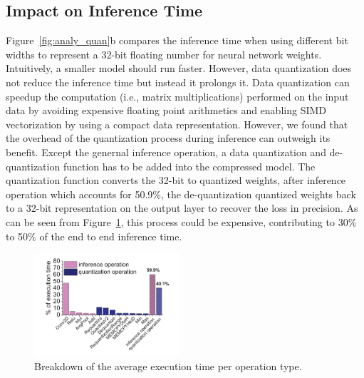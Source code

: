\subsection{Impact on Inference Time\label{sec:time}}
 Figure~\ref{fig:analy_quan}b compares the inference time when using different bit
widths to represent a 32-bit floating number for neural network weights. Intuitively, a smaller model should run faster. However, data
quantization does not reduce the inference time but instead it prolongs it. Data quantization can speedup the computation (i.e., matrix
multiplications) performed on the input data by avoiding expensive floating point arithmetics and enabling SIMD vectorization by using a
compact data representation. However, we found that the overhead of the quantization process during inference can outweigh its benefit.
Except the genernal inference operation, a data quantization and de-quantization function has to be added into the compressed model. The quantization function converts the 32-bit to quantized weights, after inference operation which
accounts for 50.9\%, the de-quantization quantized
weights back to a 32-bit representation on the output layer to recover the loss in precision. As can be seen from Figure~\ref{fig:breakdown}, this process could be expensive, contributing to 30\% to 50\% of the end to end inference time.

\begin{figure}
\begin{center}
\includegraphics[width=0.48\textwidth]{figure/breakdown4.pdf}
\end{center}
\caption{Breakdown of the average execution time per operation type.}
\vspace{-2mm}
\label{fig:breakdown}
\end{figure}


